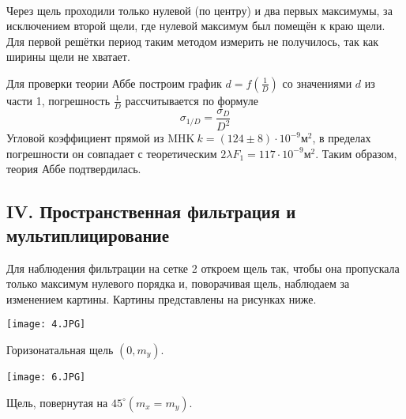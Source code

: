 \documentclass{article}
\begin{document}
\newline
\
\newline


Через щель проходили только нулевой (по центру) и два первых максимумы, за исключением второй щели, где нулевой максимум был помещён к краю щели. Для первой решётки
период таким методом измерить не получилось, так как ширины щели не хватает.

Для проверки теории Аббе построим график $d=f\left(\frac{1}{D}\right)$ со значениями $d$ из части 1, погрешность $\frac{1}{D}$ рассчитывается по формуле
$$
\sigma_{1 / D}=\frac{\sigma_{D}}{D^{2}}
$$
Угловой коэффициент прямой из $\mathrm{MHK}\ k=(124 \pm 8) \cdot 10^{-9} м^{2}$, в пределах погрешности он совпадает с теоретическим $2 \lambda F_{1}= 117\cdot 10^{-9} м^{2} .$ Таким образом, теория Аббе подтвердилась.


\newpage

 \subsection*{IV. Пространственная фильтрация и мультиплицирование}

 Для наблюдения фильтрации на сетке 2 откроем щель так, чтобы она пропускала только максимум нулевого порядка и, поворачивая щель, наблюдаем за изменением картины. Картины представлены на рисунках ниже. \\

 \begin{minipage}{0.47\textwidth}
\begin{center}
\texttt{[image: 4.JPG]}
\end{center}

\begin{center}
Горизонатальная щель $\left(0, m_{y}\right)$.
\end{center}
\end{minipage}
\begin{minipage}{0.47\textwidth}
\begin{center}
\texttt{[image: 6.JPG]}
\end{center}

\begin{center}
Щель, повернутая на $45^{\circ}\left(m_{x}=m_{y}\right)$.
\end{center}
\end{minipage}
\end{document}
